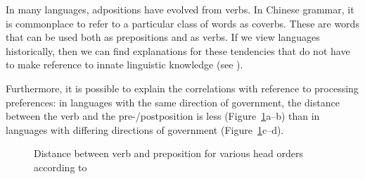In many languages, adpositions have evolved from verbs. In Chinese grammar, it is commonplace to refer to a particular class of words as coverbs.
These are words that can be used both as prepositions and as verbs. If we view languages historically, then we can find explanations for these tendencies that do not have to make
reference to innate linguistic knowledge (see \citealp[]{EL2009a}). 

Furthermore, it is possible to explain the correlations with reference to processing preferences: in languages with the same direction of government, the distance between the verb
and the pre-/postposition is less (Figure~\ref{fig-head-position}a--b) than in languages with
differing directions of government (Figure~\ref{fig-head-position}c--d).
\begin{figure}
\hfill
\hfill
{}\hfill\mbox{}

\hfill
{}
\hfill
{}
\hfill\mbox{}
\caption{Distance between verb and preposition for various head orders according to \citet[]{Newmeyer2004b}}\label{fig-head-position}
\end{figure}%
